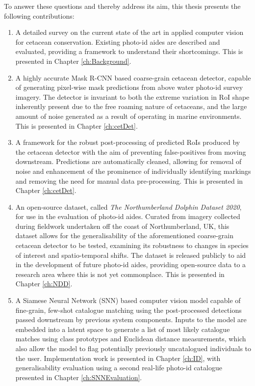 \noindent To answer these questions and thereby address its aim, this thesis presents the following contributions:

\begin{enumerate}
	\item A detailed survey on the current state of the art in applied computer vision for cetacean conservation. Existing photo-id aides are described and evaluated, providing a framework to understand their shortcomings. This is presented in Chapter \ref{ch:Background}. 
	\item A highly accurate Mask R-CNN \cite{he_mask_2017} based coarse-grain cetacean detector, capable of generating pixel-wise mask predictions from above water photo-id survey imagery. The detector is invariant to both the extreme variation in RoI shape inherently present due to the free roaming nature of cetaceans, and the large amount of noise generated as a result of operating in marine environments.  This is presented in Chapter \ref{ch:cetDet}.
	\item A framework for the robust post-processing of predicted RoIs produced by the cetacean detector with the aim of preventing false-positives from moving downstream. Predictions are automatically cleaned, allowing for removal of noise and enhancement of the prominence of individually identifying markings and removing the need for manual data pre-processing. This is presented in Chapter \ref{ch:cetDet}.
	\item An open-source dataset, called \textit{The Northumberland Dolphin Dataset 2020}, for use in the evaluation of photo-id aides. Curated from imagery collected during fieldwork undertaken off the coast of Northumberland, UK, this dataset allows for the generalisability of the aforementioned coarse-grain cetacean detector to be tested, examining its robustness to changes in species of interest and spatio-temporal shifts. The dataset is released publicly to aid in the development of future photo-id aides, providing open-source data to a research area where this is not yet commonplace. This is presented in Chapter \ref{ch:NDD}.
	\item A Siamese Neural Network (SNN) based computer vision model capable of fine-grain, few-shot catalogue matching using the post-processed detections passed downstream by previous system components. Inputs to the model are embedded into a latent space to generate a list of most likely catalogue matches using class prototypes and Euclidean distance measurements, which also allow the model to flag potentially previously uncatalogued individuals to the user. Implementation work is presented in Chapter \ref{ch:ID}, with generalisability evaluation using a second real-life photo-id catalogue presented in Chapter \ref{ch:SNNEvaluation}.
\end{enumerate}

